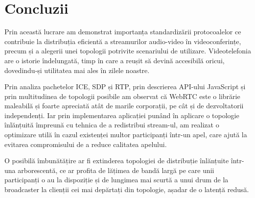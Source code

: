 \chapter{Concluzii}
\label{sec:ch7}

\indent \par Prin această lucrare am demonstrat importanța standardizării protocoalelor ce contribuie la distribuția eficientă a streamurilor audio-video în videoconferințe, precum și a alegerii unei topologii potrivite scenariului de utilizare. Videotelefonia are o istorie îndelungată, timp în care a reușit să devină accesibilă oricui, dovedindu-și utilitatea mai ales în zilele noastre.
\indent \par Prin analiza pachetelor ICE, SDP și RTP, prin descrierea API-ului JavaScript și prin multitudinea de topologii posibile am observat că WebRTC este o librărie maleabilă și foarte apreciată atât de marile corporații, pe cât și de dezvoltatorii independenți. Iar prin implementarea aplicației punând în aplicare o topologie înlănțuită împreună cu tehnica de a redistribui stream-ul, am realizat o optimizare utilă în cazul existenței multor participanți într-un apel, care ajută la evitarea compromisului de a reduce calitatea apelului.
\indent \par O posibilă îmbunătățire ar fi extinderea topologiei de distribuție înlănțuite într-una arborescentă, ce ar profita de lățimea de bandă largă pe care unii participanți o au la dispoziție și de lungimea mai scurtă a unui drum de la broadcaster la clienții cei mai depărtați din topologie, așadar de o latență redusă.